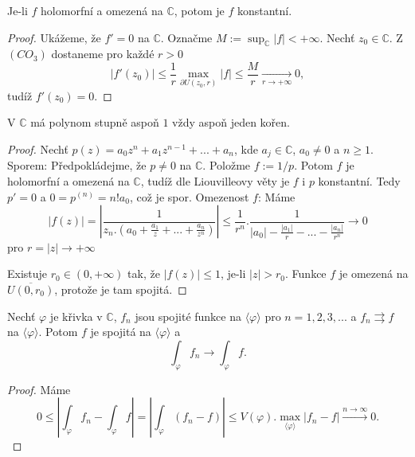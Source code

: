 
\begin{theorem}[Liouville]
Je-li $f$ holomorfní  a omezená na $\mathbb{C}$, potom je $f$ konstantní.
\end{theorem}

\begin{proof}
Ukážeme, že $f'=0$ na $\mathbb{C}$. Označme $M:=\sup_\mathbb{C}{|f|}<+\infty$. Nechť $z_0\in\mathbb{C}$. Z $(CO_3)$ dostaneme pro každé $r>0$
\[|f'(z_0)|\leq
\frac{1}{r}\max_{\partial{U(z_0,r)}}{|f|}\leq
\frac{M}{r}\underset{{r\to{+\infty}}}{\to}0,\]
tudíž $f'(z_0)=0$.
\end{proof}

\begin{consequence}
V $\mathbb{C}$ má polynom stupně aspoň $1$ vždy aspoň jeden kořen.
\end{consequence}

\begin{proof}
Nechť $p(z)={a_0}{z^n}+{a_1}{z^{n-1}}+...+{a_n}$, kde $a_j\in\mathbb{C}$, $a_0\neq{0}$ a $n\geq{1}$.\newline
Sporem: Předpokládejme, že $p\neq{0}$ na $\mathbb{C}$. Položme $f:=1/p$. Potom $f$ je holomorfní a omezená na $\mathbb{C}$, tudíž dle Liouvilleovy věty je $f$ i $p$ konstantní. Tedy $p'=0$ a $0=p^{(n)}=n!{a_0}$, což je spor.\newline
Omezenost $f$: Máme
\[|f(z)|=\left\lvert\frac{1}{z_n.\left(a_0+\frac{a_1}{z}+...+\frac{a_n}{z^n}\right)}\right\lvert\leq
\frac{1}{r^n}.\frac{1}{|a_0|-\frac{|a_1|}{r}-...-\frac{|a_n|}{r^n}}\longrightarrow 0\]
pro $r=|z|\to+\infty$

Existuje $r_0\in(0,+\infty)$ tak, že $|f(z)|\leq{1}$, je-li $|z|>r_0$. Funkce $f$ je omezená na $\overline{U(0,r_0)}$, protože je tam spojitá.
\end{proof}

\begin{lemma}
Nechť $\varphi$ je křivka v $\mathbb{C}$, $f_n$ jsou spojité funkce na $\langle\varphi\rangle$ pro $n=1,2,3,...$ a $f_n\rightrightarrows{f}$ na $\langle\varphi\rangle$. Potom $f$ je spojitá na $\langle\varphi\rangle$ a 
\[\int_\varphi{f_n}\longrightarrow\int_\varphi{f}.\]
\end{lemma}

\begin{proof}
Máme
\[0\leq\left\lvert{\int_\varphi{f_n}-\int_\varphi{f}}\right\lvert=
\left\lvert{\int_\varphi{(f_n-f)}}\right\lvert\leq{}
V(\varphi).\max_{\langle\varphi\rangle}{|f_n-f|}\overset{n\to\infty}{\longrightarrow}0.\]
\end{proof}

